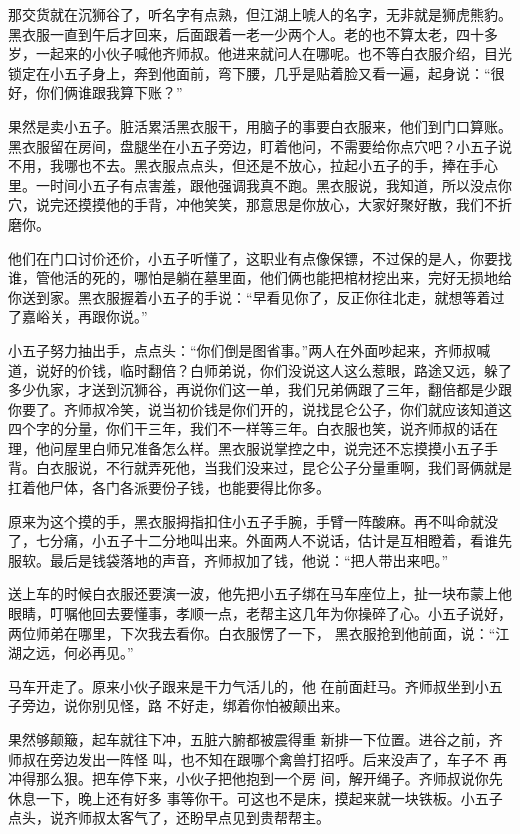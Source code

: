 那交货就在沉狮谷了，听名字有点熟，但江湖上唬人的名字，无非就是狮虎熊豹。黑衣服一直到午后才回来，后面跟着一老一少两个人。老的也不算太老，四十多岁，一起来的小伙子喊他齐师叔。他进来就问人在哪呢。也不等白衣服介绍，目光锁定在小五子身上，奔到他面前，弯下腰，几乎是贴着脸又看一遍，起身说：“很好，你们俩谁跟我算下账？”

果然是卖小五子。脏活累活黑衣服干，用脑子的事要白衣服来，他们到门口算账。黑衣服留在房间，盘腿坐在小五子旁边，盯着他问，不需要给你点穴吧？小五子说不用，我哪也不去。黑衣服点点头，但还是不放心，拉起小五子的手，捧在手心里。一时间小五子有点害羞，跟他强调我真不跑。黑衣服说，我知道，所以没点你穴，说完还摸摸他的手背，冲他笑笑，那意思是你放心，大家好聚好散，我们不折磨你。

他们在门口讨价还价，小五子听懂了，这职业有点像保镖，不过保的是人，你要找谁，管他活的死的，哪怕是躺在墓里面，他们俩也能把棺材挖出来，完好无损地给你送到家。黑衣服握着小五子的手说：“早看见你了，反正你往北走，就想等着过了嘉峪关，再跟你说。”

小五子努力抽出手，点点头：“你们倒是图省事。”两人在外面吵起来，齐师叔喊道，说好的价钱，临时翻倍？白师弟说，你们没说这人这么惹眼，路途又远，躲了多少仇家，才送到沉狮谷，再说你们这一单，我们兄弟俩跟了三年，翻倍都是少跟你要了。齐师叔冷笑，说当初价钱是你们开的，说找昆仑公子，你们就应该知道这四个字的分量，你们干三年，我们不一样等三年。白衣服也笑，说齐师叔的话在理，他问屋里白师兄准备怎么样。黑衣服说掌控之中，说完还不忘摸摸小五子手背。白衣服说，不行就弄死他，当我们没来过，昆仑公子分量重啊，我们哥俩就是扛着他尸体，各门各派要份子钱，也能要得比你多。

原来为这个摸的手，黑衣服拇指扣住小五子手腕，手臂一阵酸麻。再不叫命就没了，七分痛，小五子十二分地叫出来。外面两人不说话，估计是互相瞪着，看谁先服软。最后是钱袋落地的声音，齐师叔加了钱，他说：“把人带出来吧。”

送上车的时候白衣服还要演一波，他先把小五子绑在马车座位上，扯一块布蒙上他眼睛，叮嘱他回去要懂事，孝顺一点，老帮主这几年为你操碎了心。小五子说好，两位师弟在哪里，下次我去看你。白衣服愣了一下， 黑衣服抢到他前面，说：“江湖之远，何必再见。”

马车开走了。原来小伙子跟来是干力气活儿的，他 在前面赶马。齐师叔坐到小五子旁边，说你别见怪，路 不好走，绑着你怕被颠出来。

果然够颠簸，起车就往下冲，五脏六腑都被震得重 新排一下位置。进谷之前，齐师叔在旁边发出一阵怪 叫，也不知在跟哪个禽兽打招呼。后来没声了，车子不 再冲得那么狠。把车停下来，小伙子把他抱到一个房 间，解开绳子。齐师叔说你先休息一下，晚上还有好多 事等你干。可这也不是床，摸起来就一块铁板。小五子 点头，说齐师叔太客气了，还盼早点见到贵帮帮主。

